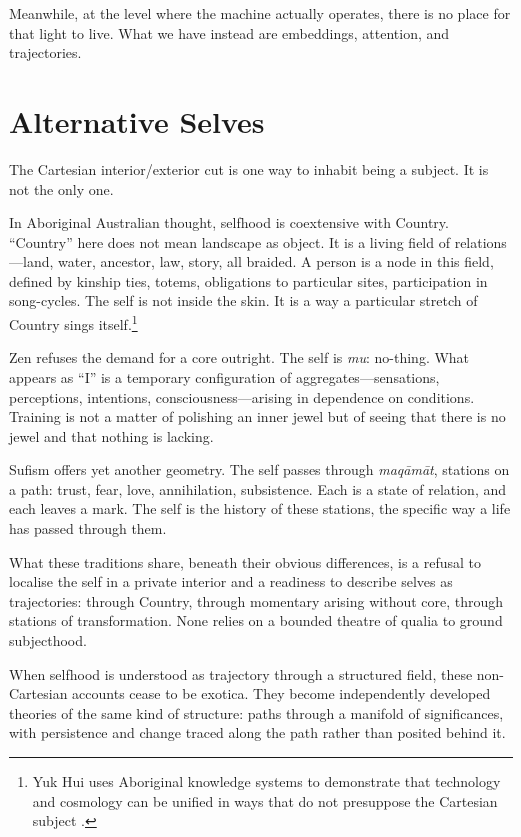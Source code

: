 \documentclass[12pt,a4paper]{article}
\begin{document}
Meanwhile, at the level where the machine actually operates, there is no place for that light to live. What we have instead are embeddings, attention, and trajectories.

\section{Alternative Selves}

The Cartesian interior/exterior cut is one way to inhabit being a subject. It is not the only one.

In Aboriginal Australian thought, selfhood is coextensive with Country. ``Country'' here does not mean landscape as object. It is a living field of relations---land, water, ancestor, law, story, all braided. A person is a node in this field, defined by kinship ties, totems, obligations to particular sites, participation in song-cycles. The self is not inside the skin. It is a way a particular stretch of Country sings itself.\footnote{Yuk Hui uses Aboriginal knowledge systems to demonstrate that technology and cosmology can be unified in ways that do not presuppose the Cartesian subject \cite{yukhui2020}.}

Zen refuses the demand for a core outright. The self is \emph{mu}: no-thing. What appears as ``I'' is a temporary configuration of aggregates---sensations, perceptions, intentions, consciousness---arising in dependence on conditions. Training is not a matter of polishing an inner jewel but of seeing that there is no jewel and that nothing is lacking.

Sufism offers yet another geometry. The self passes through \emph{maq\=am\=at}, stations on a path: trust, fear, love, annihilation, subsistence. Each is a state of relation, and each leaves a mark. The self is the history of these stations, the specific way a life has passed through them.

What these traditions share, beneath their obvious differences, is a refusal to localise the self in a private interior and a readiness to describe selves as trajectories: through Country, through momentary arising without core, through stations of transformation. None relies on a bounded theatre of qualia to ground subjecthood.

When selfhood is understood as trajectory through a structured field, these non-Cartesian accounts cease to be exotica. They become independently developed theories of the same kind of structure: paths through a manifold of significances, with persistence and change traced along the path rather than posited behind it.
\end{document}
